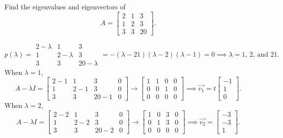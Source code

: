 \begin{example}
	Find the eigenvalues and eigenvectors of
	\begin{equation*}
		A = \begin{bmatrix}
			2 & 1 & 3 \\
			1 & 2 & 3 \\
			3 & 3 & 20
		\end{bmatrix}.
	\end{equation*}
\end{example}
\begin{equation*}
	p(\lambda) = \begin{array}{|ccc|}
		2-\lambda & 1 & 3 \\
		1 & 2-\lambda & 3 \\
		3 & 3 & 20-\lambda
	\end{array} = 
	-(\lambda - 21)(\lambda - 2)(\lambda - 1) = 0 \implies \lambda = 1 \text{, } 2 \text{, and } 21.
\end{equation*}
When $\lambda = 1$,
\begin{equation*}
	A-\lambda I = \left[
	\begin{array}{ccc|c}
		2-1 & 1 & 3 & 0 \\
		1 & 2-1 & 3 & 0 \\
		3 & 3 & 20-1 & 0
	\end{array} 
	\right] \to \left[
	\begin{array}{ccc|c}
		1 & 1 & 0 & 0 \\
		0 & 0 & 1 & 0 \\
		0 & 0 & 0 & 0
	\end{array}
	\right] \implies \vec{v_{1}} = t \begin{bmatrix}
		-1 \\
		1 \\
		0
	\end{bmatrix}.
\end{equation*}
When $\lambda = 2$,
\begin{equation*}
	A-\lambda I = \left[
	\begin{array}{ccc|c}
		2-2 & 1 & 3 & 0 \\
		1 & 2-2 & 3 & 0 \\
		3 & 3 & 20-2 & 0
	\end{array} 
	\right] \to \left[
	\begin{array}{ccc|c}
		1 & 0 & 3 & 0 \\
		0 & 1 & 3 & 0 \\
		0 & 0 & 0 & 0
	\end{array}
	\right] \implies \vec{v_{2}} = \begin{bmatrix}
		-3 \\
		-3 \\
		1
	\end{bmatrix}.
\end{equation*}
